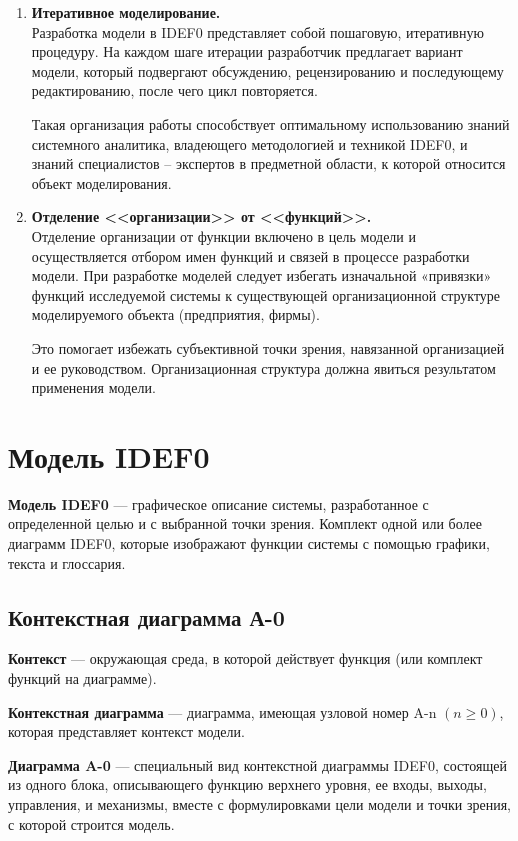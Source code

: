 \documentclass[a4paper, final]{article}
\begin{document}
\begin{enumerate}
	\item {\bf Итеративное моделирование.} \\
Разработка модели в IDEF0 представляет собой пошаговую, итеративную процедуру. На каждом шаге итерации разработчик 
предлагает вариант модели, который подвергают обсуждению, рецензированию и последующему редактированию, после чего 
цикл повторяется. 

Такая организация работы способствует оптимальному использованию знаний системного аналитика, владеющего методологией 
и техникой IDEF0, и знаний специалистов – экспертов в предметной области, к которой относится объект моделирования.

	\item {\bf Отделение <<организации>> от <<функций>>.} \\
Отделение организации от функции включено в цель модели и осуществляется отбором имен функций и связей в процессе 
разработки модели. При разработке моделей следует избегать изначальной «привязки» функций исследуемой системы к 
существующей организационной структуре моделируемого объекта (предприятия, фирмы). 
\par Это помогает избежать субъективной точки зрения, навязанной организацией и ее руководством. Организационная 
структура должна явиться результатом применения модели. \cite{bib:gost2_idef0}
\end{enumerate}

\newpage
\section{Модель IDEF0}
{\bf Модель IDEF0} --- графическое описание системы, разработанное с определенной целью и с выбранной точки зрения. 
Комплект одной или более диаграмм IDEF0, которые изображают функции системы с помощью графики, текста и глоссария.


\subsection{Контекстная диаграмма А-0}
{\bf Контекст} --- окружающая среда, в которой действует функция (или комплект функций на диаграмме).

{\bf Контекстная диаграмма} --- диаграмма, имеющая узловой номер A-n $( n\ge 0 )$, которая представляет контекст модели.

{\bf Диаграмма A-0} --- специальный вид контекстной диаграммы IDEF0, состоящей из одного блока, описывающего функцию 
верхнего уровня, ее входы, выходы, управления, и механизмы, вместе с формулировками цели модели и точки зрения, 
с которой строится модель. \cite{bib:gost_idef0}
\end{document}

